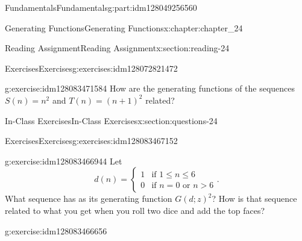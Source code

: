 \documentclass[oneside,10pt,]{book}
\numberwithin{equation}{section}
\newcommand{\gt}{>}
\begin{document}
\begin{partptx}{Fundamentals}{}{Fundamentals}{}{}{g:part:idm128049256560}
\begin{chapterptx}{Generating Functions}{}{Generating Functions}{}{}{x:chapter:chapter_24}
\begin{sectionptx}{Reading Assignment}{}{Reading Assignment}{}{}{x:section:reading-24}
\begin{exercises-subsection}{Exercises}{}{Exercises}{}{}{g:exercises:idm128072821472}
\begin{exercisegroup}
\begin{divisionexerciseeg}{2}{}{}{g:exercise:idm128083471584}%
How are the generating functions of the sequences \(S(n)=n^2\) and \(T(n)=(n+1)^2\) related?%
\end{divisionexerciseeg}%
\end{exercisegroup}
\par\medskip\noindent
\end{exercises-subsection}
\end{sectionptx}
%
%
\typeout{************************************************}
\typeout{************************************************}
%
\begin{sectionptx}{In-Class Exercises}{}{In-Class Exercises}{}{}{x:section:questions-24}
%
%
%
\typeout{************************************************}
\typeout{************************************************}
%
\begin{exercises-subsection}{Exercises}{}{Exercises}{}{}{g:exercises:idm128083467152}
\par\medskip\noindent%
%
\begin{exercisegroup}
\begin{divisionexerciseeg}{1}{}{}{g:exercise:idm128083466944}%
Let%
\begin{equation*}
d(n)=
\begin{cases}
1 & \textrm{if }1 \leq n \leq 6\\
0 & \textrm{if }n=0\textrm{ or }n \gt 6
\end{cases}.
\end{equation*}
What sequence has as its generating function \(G(d;z)^2\)?  How is that sequence related to what you get when you roll two dice and add the top faces?%
\end{divisionexerciseeg}%
\begin{divisionexerciseeg}{2}{}{}{g:exercise:idm128083466656}%

\end{divisionexerciseeg}
\end{exercisegroup}
\end{exercises-subsection}
\end{sectionptx}
\end{chapterptx}
\end{partptx}
\end{document}
